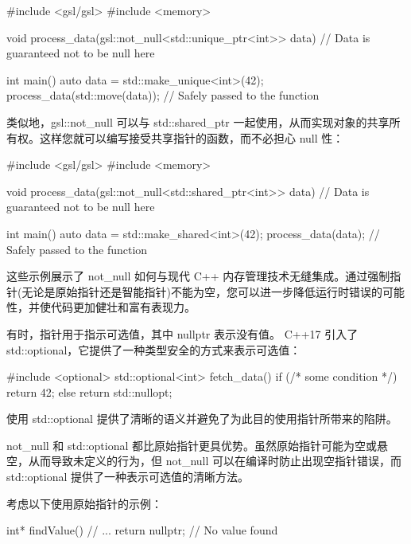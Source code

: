 \begin{cpp}
#include <gsl/gsl>
#include <memory>

void process_data(gsl::not_null<std::unique_ptr<int>> data) {
    // Data is guaranteed not to be null here
}

int main() {
    auto data = std::make_unique<int>(42);
    process_data(std::move(data)); // Safely passed to the function
}
\end{cpp}


类似地，gsl::not\_null 可以与 std::shared\_ptr 一起使用，从而实现对象的共享所有权。这样您就可以编写接受共享指针的函数，而不必担心 null 性：

\begin{cpp}
#include <gsl/gsl>
#include <memory>

void process_data(gsl::not_null<std::shared_ptr<int>> data) {
    // Data is guaranteed not to be null here
}

int main() {
    auto data = std::make_shared<int>(42);
    process_data(data); // Safely passed to the function
}
\end{cpp}

这些示例展示了 not\_null 如何与现代 C++ 内存管理技术无缝集成。通过强制指针(无论是原始指针还是智能指针)不能为空，您可以进一步降低运行时错误的可能性，并使代码更加健壮和富有表现力。


有时，指针用于指示可选值，其中 nullptr 表示没有值。 C++17 引入了 std::optional，它提供了一种类型安全的方式来表示可选值：

\begin{cpp}
#include <optional>
std::optional<int> fetch_data() {
    if (/* some condition */)
        return 42;
    else
        return std::nullopt;
}
\end{cpp}

使用 std::optional 提供了清晰的语义并避免了为此目的使用指针所带来的陷阱。


not\_null 和 std::optional 都比原始指针更具优势。虽然原始指针可能为空或悬空，从而导致未定义的行为，但 not\_null 可以在编译时防止出现空指针错误，而 std::optional 提供了一种表示可选值的清晰方法。

考虑以下使用原始指针的示例：

\begin{cpp}
int* findValue() {
    // ...
    return nullptr; // No value found
}
\end{cpp}

